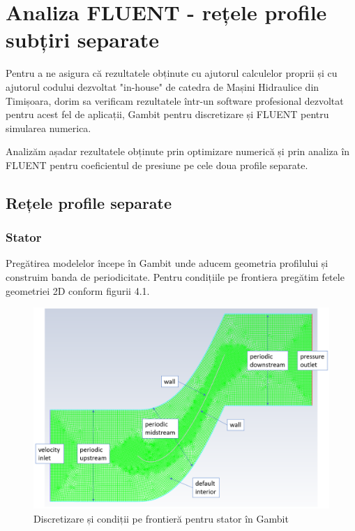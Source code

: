 \chapter{Analiza FLUENT - rețele profile subțiri separate}\label{chapter:analiza}

Pentru a ne asigura că rezultatele obținute cu ajutorul calculelor proprii și cu ajutorul codului dezvoltat "in-house" de catedra de Mașini Hidraulice din Timișoara, dorim sa verificam rezultatele într-un software profesional dezvoltat pentru acest fel de aplicații, Gambit pentru discretizare și FLUENT pentru simularea numerica.

Analizăm așadar rezultatele obținute prin optimizare numerică și prin analiza în FLUENT pentru coeficientul de presiune pe cele doua profile separate.

\section{Rețele profile separate}

\subsection{Stator}

Pregătirea modelelor începe în Gambit unde aducem geometria profilului și construim banda de periodicitate. Pentru condițiile pe frontiera pregătim fetele geometriei 2D conform figurii 4.1.

\begin{figure}[h]
	\centering
	\includegraphics[scale=0.5]{figures/mesh-stator-boundary.PNG}
	\caption{Discretizare și condiții pe frontieră pentru stator în Gambit}
	\label{Discretizare și condiții pe frontieră pentru stator în Gambit}
\end{figure}

